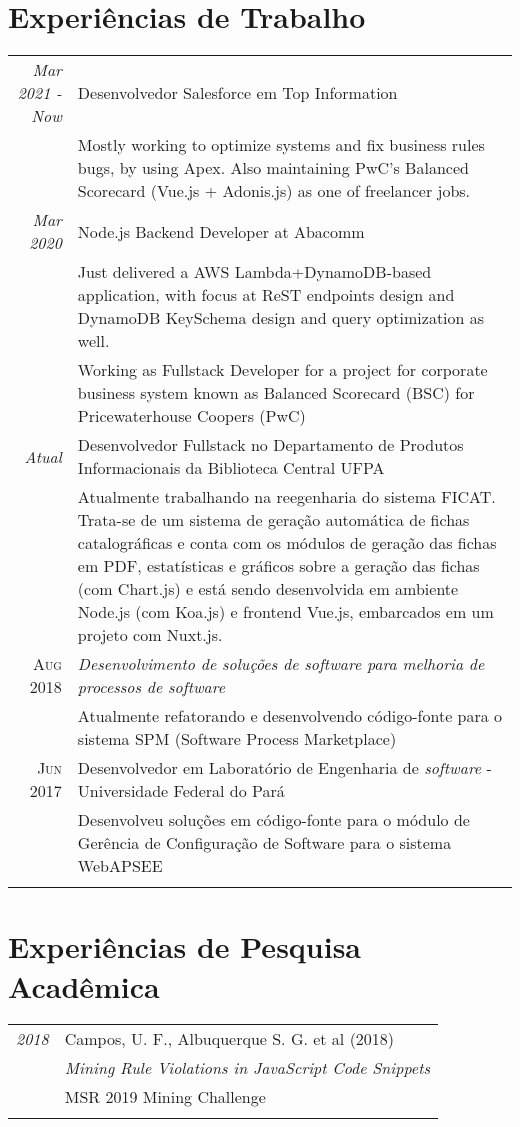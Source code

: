 \documentclass[a4paper,10pt]{article}
\begin{document}
\section{Experiências de Trabalho}
\begin{tabular}{r|p{11cm}}
\emph{Mar 2021 - Now} & Desenvolvedor Salesforce em Top Information
 \\ & \footnotesize{Mostly working to optimize systems and fix business rules bugs, by using Apex. Also maintaining PwC's Balanced Scorecard (Vue.js + Adonis.js) as one of freelancer jobs.}\\
 \emph{Mar 2020} & Node.js Backend Developer at Abacomm
 \\ & \footnotesize{Just delivered a AWS Lambda+DynamoDB-based application, with focus at ReST endpoints design and DynamoDB KeySchema design and query optimization as well.} \\
 & \footnotesize{Working as Fullstack Developer for a project for corporate business system known as Balanced Scorecard (BSC) for Pricewaterhouse Coopers (PwC)} \\
 \emph{Atual} & Desenvolvedor Fullstack no Departamento de Produtos Informacionais da Biblioteca Central UFPA\\ & \footnotesize{Atualmente trabalhando na reegenharia do sistema FICAT. Trata-se de um sistema de geração automática de fichas catalográficas e conta com os módulos de geração das fichas em PDF, estatísticas e gráficos sobre a geração das fichas (com Chart.js) e está sendo desenvolvida em ambiente Node.js (com Koa.js) e frontend Vue.js, embarcados em um projeto com Nuxt.js.} \\
 \textsc{Aug 2018} & \emph{Desenvolvimento de soluções de \textit{software} para melhoria de processos de \textit{software}}\\& \footnotesize{Atualmente refatorando e desenvolvendo código-fonte para o sistema SPM (Software Process Marketplace)}\\
 \textsc{Jun 2017} & Desenvolvedor em Laboratório de Engenharia de \textit{software} - Universidade Federal do Pará \\ & \footnotesize{Desenvolveu soluções em código-fonte para o módulo de Gerência de Configuração de Software para o sistema WebAPSEE}\\\multicolumn{2}{c}{} \\
\end{tabular}

\section{Experiências de Pesquisa Acadêmica}
\begin{tabular}{r|p{11cm}}
 \emph{2018} & Campos, U. F., Albuquerque S. G. et al (2018)\\
 & \textit{Mining Rule Violations in JavaScript Code Snippets}\\
 & MSR 2019 Mining Challenge\\\multicolumn{2}{c}{} \\
\end{tabular}
\end{document}

